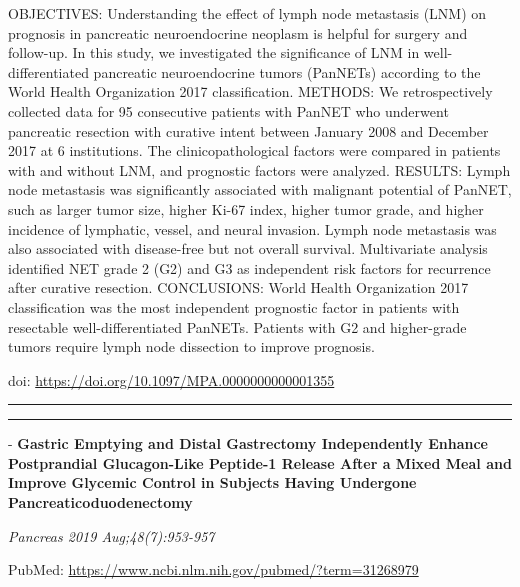 \documentclass[]{article}
\begin{document}
OBJECTIVES: Understanding the effect of lymph node metastasis (LNM) on
prognosis in pancreatic neuroendocrine neoplasm is helpful for surgery
and follow-up. In this study, we investigated the significance of LNM in
well-differentiated pancreatic neuroendocrine tumors (PanNETs) according
to the World Health Organization 2017 classification. METHODS: We
retrospectively collected data for 95 consecutive patients with PanNET
who underwent pancreatic resection with curative intent between January
2008 and December 2017 at 6 institutions. The clinicopathological
factors were compared in patients with and without LNM, and prognostic
factors were analyzed. RESULTS: Lymph node metastasis was significantly
associated with malignant potential of PanNET, such as larger tumor
size, higher Ki-67 index, higher tumor grade, and higher incidence of
lymphatic, vessel, and neural invasion. Lymph node metastasis was also
associated with disease-free but not overall survival. Multivariate
analysis identified NET grade 2 (G2) and G3 as independent risk factors
for recurrence after curative resection. CONCLUSIONS: World Health
Organization 2017 classification was the most independent prognostic
factor in patients with resectable well-differentiated PanNETs. Patients
with G2 and higher-grade tumors require lymph node dissection to improve
prognosis.

doi: \url{https://doi.org/10.1097/MPA.0000000000001355}

{}

{}

\begin{center}\rule{0.5\linewidth}{\linethickness}\end{center}

\begin{center}\rule{0.5\linewidth}{\linethickness}\end{center}

 - \textbf{Gastric Emptying and Distal Gastrectomy Independently Enhance
Postprandial Glucagon-Like Peptide-1 Release After a Mixed Meal and
Improve Glycemic Control in Subjects Having Undergone
Pancreaticoduodenectomy}

\emph{Pancreas 2019 Aug;48(7):953-957}

PubMed: \url{https://www.ncbi.nlm.nih.gov/pubmed/?term=31268979}
\end{document}
